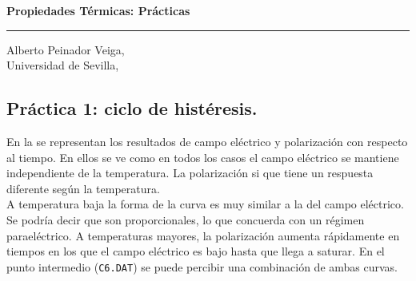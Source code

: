 \documentclass[a4paper, 12pt, spanish]{article}
\begin{document}
\pagestyle{fancy}\setcounter{page}{1}
\pagestyle{headings}
\begin{center}
\LARGE{\textbf{Propiedades Térmicas: Prácticas}} \rule{.9\textwidth}{.05cm}
\end{center}
\begin{flushright}
Alberto Peinador Veiga,\\
Universidad de Sevilla,\\
\Today
\end{flushright}

\begin{multicols}{2}
\section{Práctica 1: ciclo de histéresis.}
En la  se representan los resultados de campo eléctrico y polarización con respecto al tiempo.
En ellos se ve como en todos los casos el campo eléctrico se mantiene independiente de la temperatura. La polarización si que tiene un respuesta diferente según la temperatura.\\
A temperatura baja la forma de la curva es muy similar a la del campo eléctrico. Se podría decir que son proporcionales, lo que concuerda con un régimen paraeléctrico. A temperaturas mayores, la polarización aumenta rápidamente en tiempos en los que el campo eléctrico es bajo hasta que llega a saturar. En el punto intermedio (\texttt{C6.DAT}) se puede percibir una combinación de ambas curvas.


\end{multicols}
\end{document}
